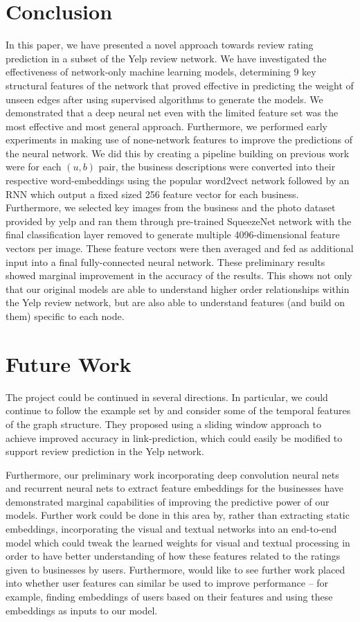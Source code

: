 \documentclass[letterpaper, 10 pt, conference]{ieeeconf}  %
\begin{document}
\section{Conclusion}
In this paper, we have presented a novel approach towards review rating prediction in a subset of the Yelp review network. We have investigated the effectiveness of network-only machine learning models, determining 9 key structural features of the network that proved effective in predicting the weight of unseen edges after using supervised algorithms to generate the models. We demonstrated that a deep neural net even with the limited feature set was the most effective and most general approach. Furthermore, we performed early experiments in making use of none-network features to improve the predictions of the neural network. We did this by creating a pipeline building on previous work were for each $(u,b)$ pair, the business descriptions were converted into their respective word-embeddings using the popular word2vect network followed by an RNN which output a fixed sized 256 feature vector for each business. Furthermore, we selected key images from the business and the photo dataset provided by yelp and ran them through pre-trained SqueezeNet network with the final classification layer removed to generate multiple 4096-dimensional feature vectors per image. These feature vectors were then averaged and fed as additional input into a final fully-connected neural network. These preliminary results showed marginal improvement in the accuracy of the results. This shows not only that our original models are able to understand higher order relationships within the Yelp review network, but are also able to understand features (and build on them) specific to each node.


\section{Future Work}
The project could be continued in several directions. In particular, we could continue to follow the example set by \cite{PintrestProject} and consider some of the temporal features of the graph structure. They proposed using a sliding window approach to achieve improved accuracy in link-prediction, which could easily be modified to support review prediction in the Yelp network.

Furthermore, our preliminary work incorporating deep convolution neural nets and recurrent neural nets to extract feature embeddings for the businesses have demonstrated marginal capabilities of improving the predictive power of our models. Further work could be done in this area by, rather than extracting static embeddings, incorporating the visual and textual networks into an end-to-end model which could tweak the learned weights for visual and textual processing in order to have better understanding of how these features related to the ratings given to businesses by users. Furthermore, would like to see further work placed into whether user features can similar be used to improve performance -- for example, finding embeddings of users based on their features and using these embeddings as inputs to our model.
\end{document}
